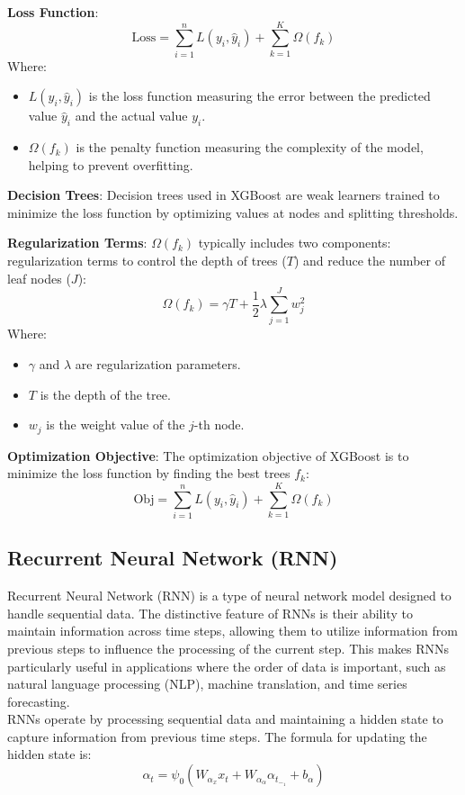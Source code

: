 \documentclass{ieeeojies}
\begin{document}
\textbf{Loss Function}:
        \[ \text{Loss} = \sum_{i=1}^{n} L(y_i, \hat{y}_i) + \sum_{k=1}^{K} \Omega(f_k) \]
        Where:
        \begin{itemize}
            \item $L(y_i, \hat{y}_i)$ is the loss function measuring the error between the predicted value $\hat{y}_i$ and the actual value $y_i$.
            \item $\Omega(f_k)$ is the penalty function measuring the complexity of the model, helping to prevent overfitting.
        \end{itemize}
        
\textbf{Decision Trees}:
        Decision trees used in XGBoost are weak learners trained to minimize the loss function by optimizing values at nodes and splitting thresholds.
        
\textbf{Regularization Terms}:
        $\Omega(f_k)$ typically includes two components: regularization terms to control the depth of trees ($T$) and reduce the number of leaf nodes ($J$):
        \[ \Omega(f_k) = \gamma T + \frac{1}{2} \lambda \sum_{j=1}^{J} w_j^2 \]
        Where:
        \begin{itemize}
            \item $\gamma$ and $\lambda$ are regularization parameters.
            \item $T$ is the depth of the tree.
            \item $w_j$ is the weight value of the $j$-th node.
        \end{itemize}
        
\textbf{Optimization Objective}:
        The optimization objective of XGBoost is to minimize the loss function by finding the best trees $f_k$:
        \[ \text{Obj} = \sum_{i=1}^{n} L(y_i, \hat{y}_i) + \sum_{k=1}^{K} \Omega(f_k) \]

\subsection{Recurrent Neural Network (RNN)}
Recurrent Neural Network (RNN) is a type of neural network model designed to handle sequential data. The distinctive feature of RNNs is their ability to maintain information across time steps, allowing them to utilize information from previous steps to influence the processing of the current step. This makes RNNs particularly useful in applications where the order of data is important, such as natural language processing (NLP), machine translation, and time series forecasting. \\
RNNs operate by processing sequential data and maintaining a hidden state to capture information from previous time steps. The formula for updating the hidden state is:
\[\alpha_t=\psi_0(W_\alpha_xx_t + W_\alpha_\alpha\alpha_t_-_1 + b_\alpha)\]
\end{document}
